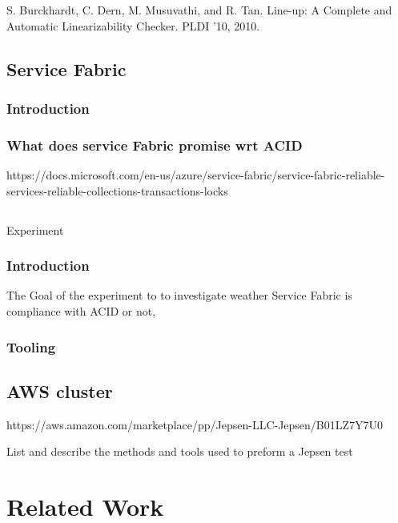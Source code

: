 \documentclass[
  a4paper,  %
  twoside,  %
  bibliography=totoc,
  headsepline,
  cleardoublepage=empty,
  parskip=half,
  draft=false
]{scrbook}
\begin{document}
S. Burckhardt, C. Dern, M. Musuvathi, and R. Tan.
Line-up: A Complete and Automatic Linearizability
Checker. PLDI ’10, 2010.


\section{Service Fabric}

\subsection{Introduction}

\subsection{What does service Fabric promise wrt ACID}

https://docs.microsoft.com/en-us/azure/service-fabric/service-fabric-reliable-services-reliable-collections-transactions-locks


\section{}{Experiment}

\subsection{Introduction}

The Goal of the experiment to to investigate weather Service Fabric is compliance with ACID or not, 


\subsection{Tooling}

\section{AWS cluster}
https://aws.amazon.com/marketplace/pp/Jepsen-LLC-Jepsen/B01LZ7Y7U0


List and describe the methods and tools used to preform a Jepsen test



\chapter{Related Work}
\end{document}
